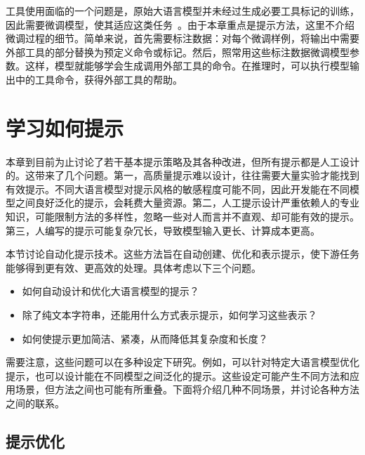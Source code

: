 工具使用面临的一个问题是，原始大语言模型并未经过生成必要工具标记的训练，因此需要微调模型，使其适应这类任务~\cite{schick-etal:2024toolformer}。由于本章重点是提示方法，这里不介绍微调过程的细节。简单来说，首先需要标注数据：对每个微调样例，将输出中需要外部工具的部分替换为预定义命令或标记。然后，照常用这些标注数据微调模型参数。这样，模型就能够学会生成调用外部工具的命令。在推理时，可以执行模型输出中的工具命令，获得外部工具的帮助。


\section{学习如何提示}

\noindent 本章到目前为止讨论了若干基本提示策略及其各种改进，但所有提示都是人工设计的。这带来了几个问题。第一，高质量提示难以设计，往往需要大量实验才能找到有效提示。不同大语言模型对提示风格的敏感程度可能不同，因此开发能在不同模型之间良好泛化的提示，会耗费大量资源。第二，人工提示设计严重依赖人的专业知识，可能限制方法的多样性，忽略一些对人而言并不直观、却可能有效的提示。第三，人编写的提示可能复杂冗长，导致模型输入更长、计算成本更高。

本节讨论自动化提示技术。这些方法旨在自动创建、优化和表示提示，使下游任务能够得到更有效、更高效的处理。具体考虑以下三个问题。

\begin{itemize}
\item \vspace{0.5em} 如何自动设计和优化大语言模型的提示？
\item \vspace{0.3em} 除了纯文本字符串，还能用什么方式表示提示，如何学习这些表示？
\item \vspace{0.3em} 如何使提示更加简洁、紧凑，从而降低其复杂度和长度？
\end{itemize}
\vspace{0.5em}

需要注意，这些问题可以在多种设定下研究。例如，可以针对特定大语言模型优化提示，也可以设计能在不同模型之间泛化的提示。这些设定可能产生不同方法和应用场景，但方法之间也可能有所重叠。下面将介绍几种不同场景，并讨论各种方法之间的联系。

\subsection{提示优化}

